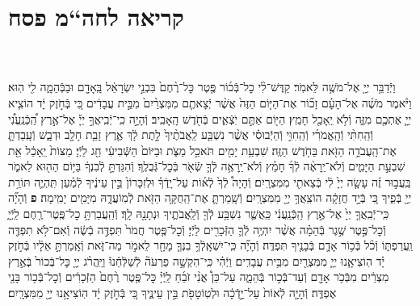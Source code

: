\documentclass[twoside, openany, parskip=half, 11pt]{book}
\begin{document}
\begin{footnotesize}
\begin{multicols}{2}
\end{multicols}

\section[חה“מ פסח]{קריאה לחה“מ פסח}


\begin{multicols}{2}

\\ \\
וַיְֿדַבֵּ֥ר יְיָ֖ אֶל־מֹשֶׁ֥ה לֵּאמֹֽר׃ קַדֶּשׁ־לִ֨י כׇל־בְּֿכ֜וֹר פֶּ֤טֶר כׇּל־רֶ֨חֶם֙ בִּבְנֵ֣י יִשְׂרָאֵ֔ל בָּֽאָדָ֖ם וּבַבְּֿהֵמָ֑ה לִ֖י הֽוּא׃ וַיֹּ֨אמֶר מֹשֶׁ֜ה אֶל־הָעָ֗ם זָכ֞וֹר אֶת־הַיּ֤וֹם הַזֶּה֙ אֲשֶׁ֨ר יְֿצָאתֶ֤ם מִמִּצְרַ֨יִם֙ מִבֵּ֣ית עֲבָדִ֔ים כִּ֚י בְּֿחֹ֣זֶק יָ֔ד הוֹצִ֧יא יְיָ֛ אֶתְכֶ֖ם מִזֶּ֑ה וְֿלֹ֥א יֵֽאָכֵ֖ל חָמֵֽץ׃ הַיּ֖וֹם אַתֶּ֣ם יֹֽצְֿאִ֑ים בְּֿחֹ֖דֶשׁ הָֽאָבִֽיב׃
וְֿהָיָ֣ה כִֽי־יְֿבִֽיאֲךָ֣ יְיָ֡ אֶל־אֶ֣רֶץ הַֽ֠כְּֿנַֽעֲנִ֠י וְֿהַֽחִתִּ֨י וְֿהָֽאֱמֹרִ֜י וְֿהַֽחִוִּ֣י וְֿהַיְֿבוּסִ֗י אֲשֶׁ֨ר נִשְׁבַּ֤ע לַֽאֲבֹתֶ֨יךָ֙ לָ֣תֶת לָ֔ךְ אֶ֛רֶץ זָבַ֥ת חָלָ֖ב וּדְבָ֑שׁ וְֿעָֽבַדְתָּ֛ אֶת־הָֽעֲבֹדָ֥ה הַזֹּ֖את בַּחֹ֥דֶשׁ הַזֶּֽה׃ שִׁבְעַ֥ת יָמִ֖ים תֹּאכַ֣ל מַצֹּ֑ת וּבַיּוֹם֙ הַשְּֿׁבִיעִ֔י חַ֖ג לַיְֿיָ׃ מַצּוֹת֙ יֵֽאָכֵ֔ל אֵ֖ת שִׁבְעַ֣ת הַיָּמִ֑ים וְֿלֹא־יֵֽרָאֶ֨ה לְֿךָ֜ חָמֵ֗ץ וְֿלֹא־יֵֽרָאֶ֥ה לְֿךָ֛ שְֿׂאֹ֖ר בְּֿכׇל־גְּֿבֻלֶֽךָ׃ וְֿהִגַּדְתָּ֣ לְֿבִנְךָ֔ בַּיּ֥וֹם הַה֖וּא לֵאמֹ֑ר בַּֽעֲב֣וּר זֶ֗ה עָשָׂ֤ה יְיָ֙ לִ֔י בְּֿצֵאתִ֖י מִמִּצְרָֽיִם׃ וְֿהָיָה֩ לְֿךָ֙ לְֿא֜וֹת עַל־יָֽדְֿךָ֗ וּלְזִכָּרוֹן֙ בֵּ֣ין עֵינֶ֔יךָ לְֿמַ֗עַן תִּֽהְיֶ֛ה תּוֹרַ֥ת יְיָ֖ בְּֿפִ֑יךָ כִּ֚י בְּֿיָ֣ד חֲזָקָ֔ה הוֹצִֽאֲךָ֥ יְיָ֖ מִמִּצְרָֽיִם׃ וְֿשָֽׁמַרְתָּ֛ אֶת־הַֽחֻקָּ֥ה הַזֹּ֖את לְֿמֽוֹעֲדָ֑הּ מִיָּמִ֖ים יָמִֽימָה׃ \textbf{פ}
וְֿהָיָ֞ה כִּֽי־יְֿבִֽאֲךָ֤ יְיָ֙ אֶל־אֶ֣רֶץ הַֽכְּֿנַֽעֲנִ֔י כַּֽאֲשֶׁ֛ר נִשְׁבַּ֥ע לְֿךָ֖ וְֿלַֽאֲבֹתֶ֑יךָ וּנְתָנָ֖הּ לָֽךְ׃ וְֿהַֽעֲבַרְתָּ֥ כׇל־פֶּֽטֶר־רֶ֖חֶם לַֽיְֿיָ֑ וְֿכׇל־פֶּ֣טֶר שֶׁ֣גֶר בְּֿהֵמָ֗ה אֲשֶׁ֨ר יִהְיֶ֥ה לְֿךָ֛ הַזְּֿכָרִ֖ים לַיְֿיָ׃ וְֿכׇל־פֶּ֤טֶר חֲמֹר֙ תִּפְדֶּ֣ה בְֿשֶׂ֔ה וְֿאִם־לֹ֥א תִפְדֶּ֖ה וַֽעֲרַפְתּ֑וֹ וְֿכֹ֨ל בְּֿכ֥וֹר אָדָ֛ם בְּֿבָנֶ֖יךָ תִּפְדֶּֽה׃ וְֿהָיָ֞ה כִּֽי־יִשְׁאָֽלְֿךָ֥ בִנְךָ֛ מָחָ֖ר לֵאמֹ֣ר מַה־זֹּ֑את וְֿאָֽמַרְתָּ֣ אֵלָ֔יו בְּֿחֹ֣זֶק יָ֗ד הֽוֹצִיאָ֧נוּ יְיָ֛ מִמִּצְרַ֖יִם מִבֵּ֥ית עֲבָדִֽים׃ וַיְֿהִ֗י כִּֽי־הִקְשָׁ֣ה פַרְעֹה֘ לְֿשַׁלְּֿחֵ֒נוּ֒ וַיַּֽהֲרֹ֨ג יְיָ֤ כׇּל־בְּֿכוֹר֙ בְּֿאֶ֣רֶץ מִצְרַ֔יִם מִבְּֿכֹ֥ר אָדָ֖ם וְֿעַד־בְּֿכ֣וֹר בְּֿהֵמָ֑ה עַל־כֵּן֩ אֲנִ֨י זֹבֵ֜חַ לַֽיְֿיָ֗ כׇּל־פֶּ֤טֶר רֶ֨חֶם֙ הַזְּֿכָרִ֔ים וְֿכׇל־בְּֿכ֥וֹר בָּנַ֖י אֶפְדֶּֽה׃ וְֿהָיָ֤ה לְֿאוֹת֙ עַל־יָ֣דְֿכָ֔ה וּלְטֽוֹטָפֹ֖ת בֵּ֣ין עֵינֶ֑יךָ כִּ֚י בְּֿחֹ֣זֶק יָ֔ד הֽוֹצִיאָ֥נוּ יְיָ֖ מִמִּצְרָֽיִם׃



\end{multicols}
\end{footnotesize}
\end{document}
